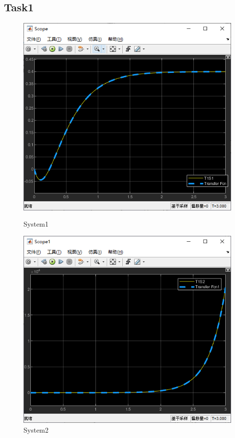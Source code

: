 \documentclass[12pt,a4paper,oneside]{ctexart}
\begin{document}
    \subsection{Task1}
    \begin{figure}[H]
        \centering
        \includegraphics[height = 0.4\textheight]{../screenshots/MT1S1Result.PNG}
        \caption{System1}
        \includegraphics[height = 0.4\textheight]{../screenshots/MT1S2Result.PNG}
        \caption{System2}
    \end{figure}
\end{document}
